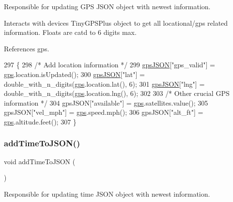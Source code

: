 Responsible for updating G\+PS J\+S\+ON object with newest information. 

Interacts with devices Tiny\+G\+P\+S\+Plus object to get all locational/gps related information. Floats are cat\textquotesingle{}d to 6 digits max. 

References gps.


\begin{DoxyCode}
297 \{
298   \textcolor{comment}{/* Add location information */}
299   \hyperlink{logging-device_8ino_a548727e041a5cd3db91bdbd0ccd71e30}{gpsJSON}[\textcolor{stringliteral}{"gps\_valid"}] = \hyperlink{logging-device_8ino_a169c53997a7da1d0fb99aec1b4675ce8}{gps}.location.isUpdated();
300   \hyperlink{logging-device_8ino_a548727e041a5cd3db91bdbd0ccd71e30}{gpsJSON}[\textcolor{stringliteral}{"lat"}] = double\_with\_n\_digits(\hyperlink{logging-device_8ino_a169c53997a7da1d0fb99aec1b4675ce8}{gps}.location.lat(), 6);
301   \hyperlink{logging-device_8ino_a548727e041a5cd3db91bdbd0ccd71e30}{gpsJSON}[\textcolor{stringliteral}{"lng"}] = double\_with\_n\_digits(\hyperlink{logging-device_8ino_a169c53997a7da1d0fb99aec1b4675ce8}{gps}.location.lng(), 6);
302 
303   \textcolor{comment}{/* Other crucial GPS information */}
304   gpsJSON[\textcolor{stringliteral}{"available"}] = \hyperlink{logging-device_8ino_a169c53997a7da1d0fb99aec1b4675ce8}{gps}.satellites.value();
305   gpsJSON[\textcolor{stringliteral}{"vel\_mph"}] = \hyperlink{logging-device_8ino_a169c53997a7da1d0fb99aec1b4675ce8}{gps}.speed.mph();
306   gpsJSON[\textcolor{stringliteral}{"alt\_ft"}] = \hyperlink{logging-device_8ino_a169c53997a7da1d0fb99aec1b4675ce8}{gps}.altitude.feet();
307 \}
\end{DoxyCode}
\mbox{\label{logging-device_8ino_a9e4931f452cd25dfff67d41e7c9c0efb}} 
\subsubsection{\texorpdfstring{add\+Time\+To\+J\+S\+O\+N()}{addTimeToJSON()}}
{\footnotesize\ttfamily void add\+Time\+To\+J\+S\+ON (\begin{DoxyParamCaption}{ }\end{DoxyParamCaption})}



Responsible for updating time J\+S\+ON object with newest information. 

